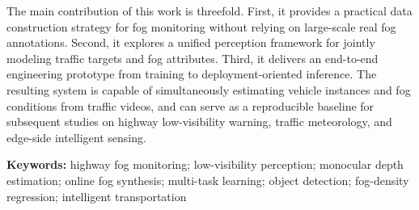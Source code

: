 The main contribution of this work is threefold. First, it provides a practical data construction strategy for fog monitoring without relying on large-scale real fog annotations. Second, it explores a unified perception framework for jointly modeling traffic targets and fog attributes. Third, it delivers an end-to-end engineering prototype from training to deployment-oriented inference. The resulting system is capable of simultaneously estimating vehicle instances and fog conditions from traffic videos, and can serve as a reproducible baseline for subsequent studies on highway low-visibility warning, traffic meteorology, and edge-side intelligent sensing.

\vspace{1em}
\noindent\textbf{Keywords:} highway fog monitoring; low-visibility perception; monocular depth estimation; online fog synthesis; multi-task learning; object detection; fog-density regression; intelligent transportation
